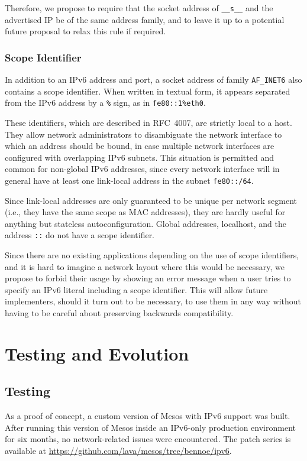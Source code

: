 \documentclass{scrreprt}
\begin{document}
Therefore, we propose to require that the socket address of \texttt{\_\_s\_\_} and the
advertised IP be of the same address family, and to leave it up to a potential future
proposal to relax this rule if required.


\subsection{Scope Identifier}
\label{scope_id}
In addition to an IPv6 address and port, a socket address of family \texttt{AF\_INET6} also contains
a scope identifier. When written in textual form, it appears separated from the IPv6 address
by a \texttt{\%} sign, as in \texttt{fe80::1\%eth0}.

These identifiers, which are described in RFC~4007, are strictly local to a host.
They allow network administrators to disambiguate the network interface to which an address
should be bound, in case multiple network interfaces are configured with overlapping IPv6 subnets.
This situation is permitted and common for non-global IPv6 addresses, since every network
interface will in general have at least one link-local address in the subnet \texttt{fe80::/64}.

Since link-local addresses are only guaranteed to be unique per network segment
(i.e., they have the same scope as MAC addresses), they are hardly useful for anything but
stateless autoconfiguration.
Global addresses, localhost, and the address \texttt{::} do not have a scope identifier.

Since there are no existing applications depending on the use of scope identifiers,
and it is hard to imagine a network layout where this would be necessary,
we propose to forbid their usage by showing an error message when a user tries
to specify an IPv6 literal including a scope identifier. This will allow future
implementers, should it turn out to be necessary, to use them in any way without having
to be careful about preserving backwards compatibility.




\chapter{Testing and Evolution}
\section{Testing}
As a proof of concept, a custom version of Mesos with IPv6 support was built.
After running this version of Mesos inside an IPv6-only production environment
for six months, no network-related issues were encountered.
The patch series is available at
\href{https://github.com/lava/mesos/tree/bennoe/ipv6}{https://github.com/lava/mesos/tree/bennoe/ipv6}.
\end{document}
